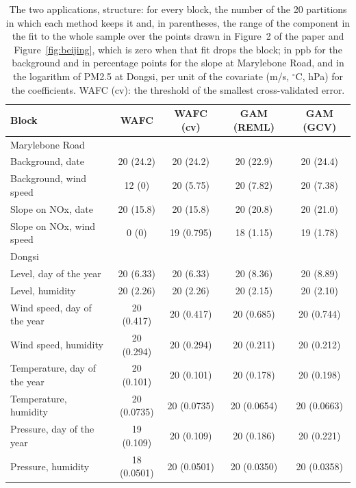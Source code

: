 \begin{table}[tp]
\color{colR1}
\caption{The two applications, structure: for every block, the number of the
20 partitions in which each method keeps it and, in parentheses, the range of
the component in the fit to the whole sample over the points drawn in
Figure~2 of the paper and Figure~\ref{fig:beijing}, which is zero when that
fit drops the block; in ppb for the background and in percentage points for
the slope at Marylebone Road, and in the logarithm of PM2.5 at Dongsi, per
unit of the covariate (m/s, $^{\circ}$C, hPa) for the coefficients. WAFC
(cv): the threshold of the smallest cross-validated error.}
\label{tab:app-structure}
\centering
\small
\setlength{\tabcolsep}{5pt}
\begin{tabular}{lcccc}
\hline
Block & WAFC & WAFC (cv) & GAM (REML) & GAM (GCV) \\
\hline
\multicolumn{5}{l}{Marylebone Road} \\
Background, date & 20 (24.2) & 20 (24.2) & 20 (22.9) & 20 (24.4) \\
Background, wind speed & 12 (0) & 20 (5.75) & 20 (7.82) & 20 (7.38) \\
Slope on NOx, date & 20 (15.8) & 20 (15.8) & 20 (20.8) & 20 (21.0) \\
Slope on NOx, wind speed & 0 (0) & 19 (0.795) & 18 (1.15) & 19 (1.78) \\
\hline
\multicolumn{5}{l}{Dongsi} \\
Level, day of the year & 20 (6.33) & 20 (6.33) & 20 (8.36) & 20 (8.89) \\
Level, humidity & 20 (2.26) & 20 (2.26) & 20 (2.15) & 20 (2.10) \\
Wind speed, day of the year & 20 (0.417) & 20 (0.417) & 20 (0.685) & 20 (0.744) \\
Wind speed, humidity & 20 (0.294) & 20 (0.294) & 20 (0.211) & 20 (0.212) \\
Temperature, day of the year & 20 (0.101) & 20 (0.101) & 20 (0.178) & 20 (0.198) \\
Temperature, humidity & 20 (0.0735) & 20 (0.0735) & 20 (0.0654) & 20 (0.0663) \\
Pressure, day of the year & 19 (0.109) & 20 (0.109) & 20 (0.186) & 20 (0.221) \\
Pressure, humidity & 18 (0.0501) & 20 (0.0501) & 20 (0.0350) & 20 (0.0358) \\
\hline
\end{tabular}
\end{table}
